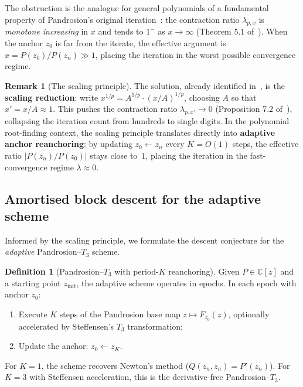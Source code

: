 \documentclass[11pt,a4paper]{article}
\theoremstyle{definition}
\newtheorem{definition}{Definition}[section]
\newtheorem{remark}{Remark}[section]
\newcommand{\CC}{\mathbb{C}}
\begin{document}
The obstruction is the analogue for general polynomials of a fundamental property of Pandrosion's original iteration~\cite{besevic2026}: the contraction ratio $\lambda_{p,x}$ is \emph{monotone increasing} in $x$ and tends to $1^-$ as $x \to \infty$ (Theorem 5.1 of~\cite{besevic2026}).  When the anchor $z_0$ is far from the iterate, the effective argument is $x = P(z_0)/P(z_n) \gg 1$, placing the iteration in the worst possible convergence regime.

\begin{remark}[The scaling principle]
\label{rem:scaling_principle}
The solution, already identified in~\cite{besevic2026}, is the \textbf{scaling reduction}: write $x^{1/p} = A^{1/p} \cdot (x/A)^{1/p}$, choosing $A$ so that $x' = x/A \approx 1$.  This pushes the contraction ratio $\lambda_{p,x'} \to 0$ (Proposition 7.2 of~\cite{besevic2026}), collapsing the iteration count from hundreds to single digits.  In the polynomial root-finding context, the scaling principle translates directly into \textbf{adaptive anchor reanchoring}: by updating $z_0 \leftarrow z_n$ every $K = O(1)$ steps, the effective ratio $|P(z_n)/P(z_0)|$ stays close to~$1$, placing the iteration in the fast-convergence regime $\lambda \approx 0$.
\end{remark}

\subsection{Amortised block descent for the adaptive scheme}
\label{sec:amortised_block}

Informed by the scaling principle, we formulate the descent conjecture for the \emph{adaptive} Pandrosion--$T_3$ scheme.

\begin{definition}[Pandrosion--$T_3$ with period-$K$ reanchoring]
\label{def:pandrosion_T3_adaptive}
Given $P \in \CC[z]$ and a starting point $z_{\mathrm{init}}$, the adaptive scheme operates in epochs.  In each epoch with anchor $z_0$:
\begin{enumerate}
  \item Execute $K$ steps of the Pandrosion base map $z \mapsto F_{z_0}(z)$, optionally accelerated by Steffensen's $T_3$ transformation;
  \item Update the anchor: $z_0 \leftarrow z_K$.
\end{enumerate}
For $K=1$, the scheme recovers Newton's method ($Q(z_n,z_n) = P'(z_n)$).  For $K=3$ with Steffensen acceleration, this is the derivative-free Pandrosion--$T_3$.
\end{definition}
\end{document}
